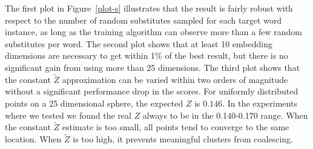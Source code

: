 The first plot in Figure~\ref{plot-s} illustrates that the result is
fairly robust with respect to the number of random substitutes sampled
for each target word instance, as long as the training algorithm can
observe more than a few random substitutes per word.  The second plot
shows that at least 10 embedding dimensions are necessary to get
within 1\% of the best result, but there is no significant gain from
using more than 25 dimensions.  The third plot shows that the constant
$\tilde{Z}$ approximation can be varied within two orders of magnitude
without a significant performance drop in the scores.  For uniformly
distributed points on a 25 dimensional sphere, the expected $Z$ is
$0.146$.  In the experiments where we tested we found the real $Z$
always to be in the 0.140-0.170 range.  When the constant $\tilde{Z}$
estimate is too small, all points tend to converge to the same
location.  When $\tilde{Z}$ is too high, it prevents meaningful
clusters from coalescing.


